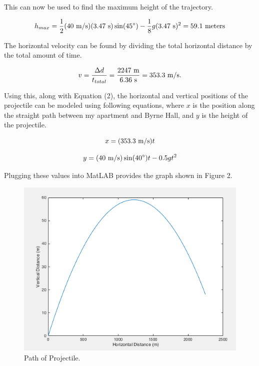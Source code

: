 \documentclass[11pt, oneside]{article}   	%
\begin{document}
This can now be used to find the maximum height of the trajectory.

\begin{equation}
h_{max} = \frac{1}{2}(40 \textnormal{ m/s})(3.47 \textnormal{ s})\sin(45^{\circ})-\frac{1}{8}g (3.47 \textnormal{ s})^2 = 59.1 \textnormal{ meters}
\end{equation}

The horizontal velocity can be found by dividing the total horizontal distance by the total amount of time.

\begin{equation}
v = \frac{\Delta d}{t_{total}} = \frac{2247 \textnormal{ m}}{6.36 \textnormal{ s}} = 353.3 \textnormal{ m/s}.
\end{equation}

Using this, along with Equation (2), the horizontal and vertical positions of the projectile can be modeled using following equations, where $x$ is the position along the straight path between my apartment and Byrne Hall, and $y$ is the height of the projectile.

\begin{equation}
x = (353.3 \textnormal{ m/s})t
\end{equation} 

\begin{equation}
y = (40 \textnormal{ m/s})\sin(40^{\circ})t-0.5gt^2
\end{equation} 

Plugging these values into MatLAB provides the graph shown in Figure 2.

\begin{figure}
\centering
  \includegraphics[width=\linewidth]{graph.png}
  \caption{Path of Projectile.}
  \label{fig:boat1}
\end{figure}
\end{document}
